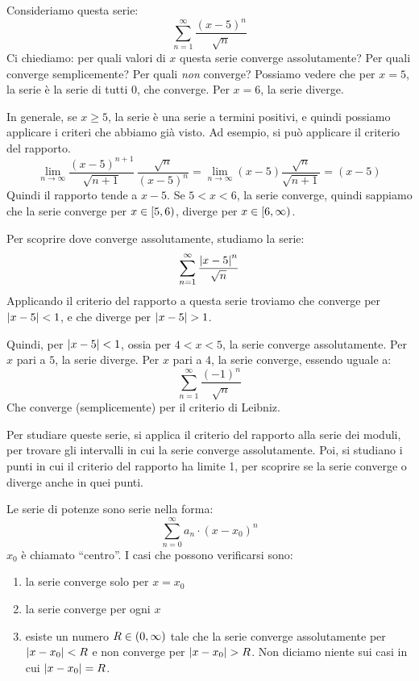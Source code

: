 \begin{exmp}
Consideriamo questa serie:
\[
\sum_{n = 1}^{\infty} \frac{(x - 5)^n}{\sqrt{n}}
\]
Ci chiediamo: per quali valori di $x$ questa serie converge assolutamente? Per quali converge semplicemente? Per quali \emph{non} converge? Possiamo vedere che per $x = 5$, la serie \`e la serie di tutti 0, che converge. Per $x = 6$, la serie diverge.

In generale, se $x \ge 5$, la serie \`e una serie a termini positivi, e quindi possiamo applicare i criteri che abbiamo gi\`a visto. Ad esempio, si pu\`o applicare il criterio del rapporto.
\[
\lim_{n \to \infty} \frac{(x - 5)^{n+1}}{\sqrt{n+1}} \, \frac{\sqrt{n}}{(x - 5)^n} = \lim_{n \to \infty} (x - 5) \frac{\sqrt{n}}{\sqrt{n+1}} = (x - 5)
\]
Quindi il rapporto tende a $x - 5$. Se $5 < x < 6$, la serie converge, quindi sappiamo che la serie converge per $x \in \left[ {5}, {6} \right)$, diverge per $x \in \left[ {6}, {\infty} \right)$.

Per scoprire dove converge assolutamente, studiamo la serie:
\[
\sum_{n = 1}^{\infty} \frac{\abs{x - 5}^n}{\sqrt{n}}
\]
Applicando il criterio del rapporto a questa serie troviamo che converge per $\left\lvert{x - 5}\right\rvert < 1$, e che diverge per $\left\lvert{x - 5}\right\rvert > 1$.

Quindi, per $\left\lvert{x - 5}\right\rvert < 1$, ossia per $4 < x < 5$, la serie converge assolutamente. Per $x$ pari a $5$, la serie diverge. Per $x$ pari a $4$, la serie converge, essendo uguale a:
\[
\sum_{n = 1}^{\infty} \frac{(-1)^n}{\sqrt{n}}
\]
Che converge (semplicemente) per il criterio di Leibniz.
\end{exmp}

Per studiare queste serie, si applica il criterio del rapporto alla serie dei moduli, per trovare gli intervalli in cui la serie converge assolutamente. Poi, si studiano i punti in cui il criterio del rapporto ha limite 1, per scoprire se la serie converge o diverge anche in quei punti.

Le serie di potenze sono serie nella forma:
\[
\sum_{n = 0}^{\infty} a_n \cdot (x - x_0)^n
\]
$x_0$ \`e chiamato ``centro''. I casi che possono verificarsi sono:
\begin{enumerate}
    \item la serie converge solo per $x = x_0$
    \item la serie converge per ogni $x$
    \item esiste un numero $R \in \left( {0}, {\infty} \right)$ tale che la serie converge assolutamente per $\left\lvert{x - x_0}\right\rvert < R$ e non converge per $\left\lvert{x - x_0}\right\rvert > R$. Non diciamo niente sui casi in cui $\left\lvert{x - x_0}\right\rvert = R$.
\end{enumerate}

